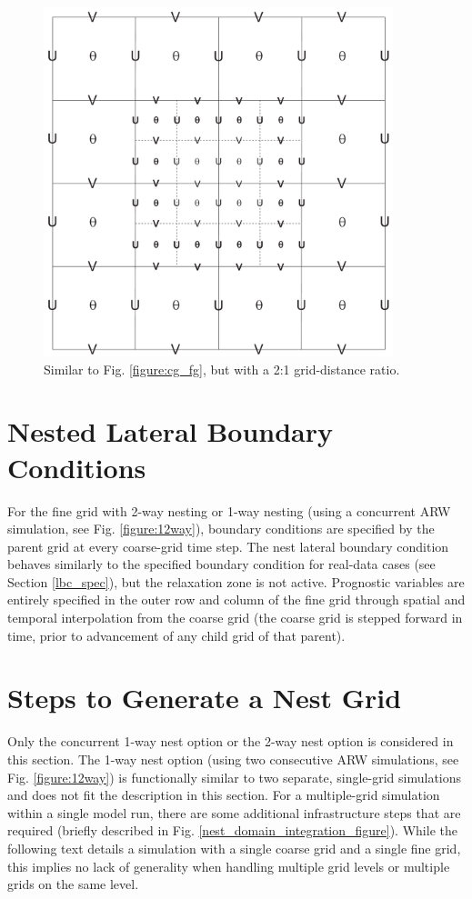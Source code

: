 %
%
\begin{figure}
  \centering
  \includegraphics[width=4in]{figures/cg_fg_x2.pdf}
  \caption{\label{figure:cg_fg_x2}
Similar to Fig. \ref{figure:cg_fg}, but with a 2:1 grid-distance ratio.
}
\end{figure}

\section{Nested Lateral Boundary Conditions}
\label{nest-lbc}

For the fine grid with 2-way nesting or 1-way nesting 
(using a concurrent ARW simulation, see 
Fig. \ref{figure:12way}),
boundary conditions are specified by the parent grid
at every coarse-grid time step. The nest lateral boundary condition behaves similarly to the 
specified boundary condition for real-data cases (see Section \ref{lbc_spec}), but
the relaxation zone is not active. Prognostic variables are entirely specified in the outer row and column
of the fine grid through spatial and temporal interpolation from the coarse grid (the coarse grid is
stepped forward in time, prior to advancement of any child grid of that parent).

\section{Steps to Generate a Nest Grid}

Only the concurrent 1-way nest option or the 2-way nest
option is considered in this section.  The 1-way nest option (using two
consecutive ARW simulations, see Fig. \ref{figure:12way}) 
is functionally similar to two separate,
single-grid simulations and does not fit the description in this section. 
For a multiple-grid simulation within a single model run, there are some
additional infrastructure steps that are required (briefly described in
Fig. \ref{nest_domain_integration_figure}).  While the following text
details a simulation with a single coarse grid and a single fine grid,
this implies no lack of generality when handling multiple grid levels or
multiple grids on the same level.  

